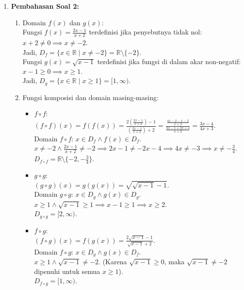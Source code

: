 \documentclass[11pt,openany,a4paper]{article}
\begin{document}
\begin{enumerate}
  \item \textbf{Pembahasan Soal 2:}
        \begin{enumerate}
          \item Domain $f(x)$ dan $g(x)$: \\
                Fungsi $f(x) = \frac{2x-1}{x+2}$ terdefinisi jika penyebutnya tidak nol: $x + 2 \ne 0 \implies x \ne -2$. \\
                Jadi, $D_f = \{x \in \mathbb{R} \mid x \ne -2\} = \mathbb{R} \setminus \{-2\}$. \\
                Fungsi $g(x) = \sqrt{x-1}$ terdefinisi jika fungsi di dalam akar non-negatif: $x - 1 \ge 0 \implies x \ge 1$. \\
                Jadi, $D_g = \{x \in \mathbb{R} \mid x \ge 1\} = [1, \infty)$.
          \item Fungsi komposisi dan domain masing-masing:
                \begin{itemize}
                  \item $f \circ f$: \\
                        $(f \circ f)(x) = f(f(x)) = \frac{2\left(\frac{2x-1}{x+2}\right)-1}{\left(\frac{2x-1}{x+2}\right)+2} = \frac{\frac{4x-2-x-2}{x+2}}{\frac{2x-1+2x+4}{x+2}} = \frac{3x-4}{4x+3}$. \\
                        Domain $f \circ f$: $x \in D_f \land f(x) \in D_f$. \\
                        $x \ne -2 \land \frac{2x-1}{x+2} \ne -2 \implies 2x - 1 \ne -2x - 4 \implies 4x \ne -3 \implies x \ne -\frac{3}{4}$. \\
                        $D_{f \circ f} = \mathbb{R} \setminus \{-2, -\frac{3}{4}\}$.

                  \item $g \circ g$: \\
                        $(g \circ g)(x) = g(g(x)) = \sqrt{\sqrt{x-1} - 1}$. \\
                        Domain $g \circ g$: $x \in D_g \land g(x) \in D_g$. \\
                        $x \ge 1 \land \sqrt{x-1} \ge 1 \implies x - 1 \ge 1 \implies x \ge 2$. \\
                        $D_{g \circ g} = [2, \infty)$.

                  \item $f \circ g$: \\
                        $(f \circ g)(x) = f(g(x)) = \frac{2\sqrt{x-1}-1}{\sqrt{x-1}+2}$. \\
                        Domain $f \circ g$: $x \in D_g \land g(x) \in D_f$. \\
                        $x \ge 1 \land \sqrt{x-1} \ne -2$. (Karena $\sqrt{x-1} \ge 0$, maka $\sqrt{x-1} \ne -2$ dipenuhi untuk semua $x \ge 1$). \\
                        $D_{f \circ g} = [1, \infty)$.


\end{itemize}
\end{enumerate}
\end{enumerate}
\end{document}
